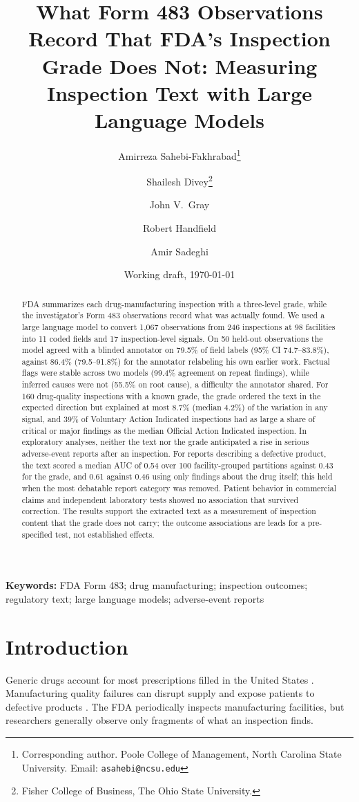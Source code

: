 \documentclass[12pt]{article}
\title{What Form 483 Observations Record That FDA's Inspection Grade Does Not: Measuring Inspection Text with Large Language Models}
\author{
  Amirreza Sahebi-Fakhrabad\thanks{Corresponding author.
    Poole College of Management, North Carolina State University.
    Email: \texttt{asahebi@ncsu.edu}} \and
  Shailesh Divey\thanks{Fisher College of Business, The Ohio State University.} \and
  John V.\ Gray\footnotemark[2] \and
  Robert Handfield\footnotemark[1] \and
  Amir Sadeghi\footnotemark[1]
}
\date{Working draft, \today}
\begin{document}
\maketitle

\begin{abstract}
FDA summarizes each drug-manufacturing inspection with a three-level grade,
while the investigator's Form 483 observations record what was actually
found. We used a large language model to convert 1,067 observations from 246
inspections at 98 facilities into 11 coded fields and 17 inspection-level
signals. On 50 held-out observations the model agreed with a blinded
annotator on 79.5\% of field labels (95\% CI 74.7--83.8\%), against 86.4\%
(79.5--91.8\%) for the annotator relabeling his own earlier work. Factual
flags were stable across two models (99.4\% agreement on repeat findings),
while inferred causes were not (55.5\% on root cause), a difficulty the
annotator shared. For 160 drug-quality inspections with a known grade, the
grade ordered the text in the expected direction but explained at most
8.7\% (median 4.2\%) of the variation in any signal, and 39\% of Voluntary
Action Indicated inspections had as large a share of critical or major
findings as the median Official Action Indicated inspection. In exploratory
analyses, neither the text nor the grade anticipated a rise in serious
adverse-event reports after an inspection. For reports describing a
defective product, the text scored a median AUC of 0.54 over 100
facility-grouped partitions against 0.43 for the grade, and 0.61 against
0.46 using only findings about the drug itself; this held when the most
debatable report category was removed. Patient behavior in commercial
claims and independent laboratory tests showed no association that survived
correction. The results support the extracted text as a measurement of
inspection content that the grade does not carry; the outcome associations
are leads for a pre-specified test, not established effects.
\end{abstract}

\textbf{Keywords:} FDA Form 483; drug manufacturing; inspection outcomes;
regulatory text; large language models; adverse-event reports

\section{Introduction}
\label{sec:intro}

Generic drugs account for most prescriptions filled in the United States
\citep{fda2023generic}. Manufacturing quality failures can disrupt supply and
expose patients to defective products \citep{fox2014shortage}. The FDA
periodically inspects manufacturing facilities, but researchers generally
observe only fragments of what an inspection finds.
\end{document}
